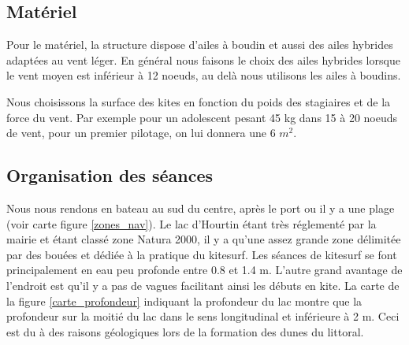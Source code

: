 \documentclass[11pt,a4paper]{report}
\begin{document}
\subsection{Matériel}
Pour le matériel, la structure dispose d'ailes à boudin et aussi des ailes 
hybrides adaptées au vent léger. En général nous faisons le choix des ailes hybrides 
lorsque le vent moyen est inférieur à 12 noeuds, au delà nous utilisons
les ailes à boudins. 

Nous choisissons la surface des kites
en fonction du poids des stagiaires et de la force du vent.
Par exemple pour un adolescent pesant 45 kg dans 15 à 20 noeuds
de vent, pour un premier pilotage, on lui donnera une 6 $m^2$.

\subsection{Organisation des séances}
Nous nous rendons en bateau au sud du centre, après le port ou il y a 
une plage (voir carte figure \ref{zones_nav}). Le lac d'Hourtin étant très 
réglementé par la mairie et étant classé zone Natura 2000\cite{natura2000}, 
il y a qu'une assez grande zone délimitée par des bouées et dédiée à la pratique
du kitesurf.
Les séances de kitesurf se font principalement en eau peu profonde entre 0.8 et 1.4 m.
L'autre grand avantage de l'endroit est qu'il y a pas de vagues facilitant ainsi
les débuts en kite.
La carte de la figure \ref{carte_profondeur} indiquant la profondeur du lac
montre que la profondeur sur la moitié du lac dans le sens longitudinal 
et inférieure à 2 m. Ceci est du à des raisons géologiques lors de la
formation des dunes du littoral.
\end{document}
